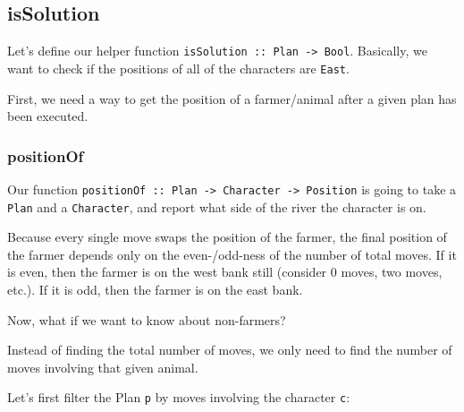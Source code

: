 \documentclass[]{article}
\newenvironment{Shaded}{}{}
\newcommand{\KeywordTok}[1]{\textcolor[rgb]{0.00,0.44,0.13}{\textbf{{#1}}}}
\newcommand{\DataTypeTok}[1]{\textcolor[rgb]{0.56,0.13,0.00}{{#1}}}
\newcommand{\OtherTok}[1]{\textcolor[rgb]{0.00,0.44,0.13}{{#1}}}
\newcommand{\FunctionTok}[1]{\textcolor[rgb]{0.02,0.16,0.49}{{#1}}}
\newcommand{\NormalTok}[1]{{#1}}
\begin{document}
\subsection{isSolution}\label{issolution}

Let's define our helper function
\texttt{isSolution\ ::\ Plan\ -\textgreater{}\ Bool}. Basically, we want
to check if the positions of all of the characters are \texttt{East}.

First, we need a way to get the position of a farmer/animal after a
given plan has been executed.

\subsubsection{positionOf}\label{positionof}

Our function
\texttt{positionOf\ ::\ Plan\ -\textgreater{}\ Character\ -\textgreater{}\ Position}
is going to take a \texttt{Plan} and a \texttt{Character}, and report
what side of the river the character is on.

Because every single move swaps the position of the farmer, the final
position of the farmer depends only on the even-/odd-ness of the number
of total moves. If it is even, then the farmer is on the west bank still
(consider 0 moves, two moves, etc.). If it is odd, then the farmer is on
the east bank.

\begin{Shaded}
\end{Shaded}

Now, what if we want to know about non-farmers?

Instead of finding the total number of moves, we only need to find the
number of moves involving that given animal.

Let's first filter the Plan \texttt{p} by moves involving the character
\texttt{c}:
\end{document}
